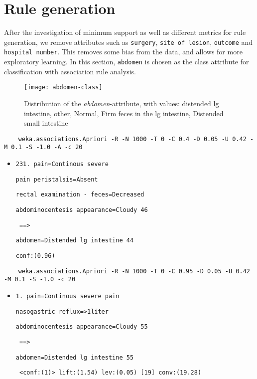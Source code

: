 \section{Rule generation} \label{sec: rule gen}
After the investigation of minimum support as well as different metrics for rule generation, we remove attributes such as \verb|surgery|, \verb|site of lesion|, \verb|outcome| and \verb|hospital number|. This removes some bias from the data, and allows for more exploratory learning. In this section, \verb|abdomen| is chosen as the class attribute for classification with association rule analysis.

\begin{figure}[H]
\centering
\texttt{[image: abdomen-class]}
\caption{Distribution of the \textit{abdomen}-attribute, with values: distended lg intestine, other, Normal, Firm feces in the lg intestine, Distended small intestine}
\end{figure}

\begin{verbatim}
	weka.associations.Apriori -R -N 1000 -T 0 -C 0.4 -D 0.05 -U 0.42 -M 0.1 -S -1.0 -A -c 20
\end{verbatim}
\begin{itemize}
\item \verb|231. pain=Continous severe|

\verb|pain peristalsis=Absent |

\verb|rectal examination - feces=Decreased |

\verb|abdominocentesis appearance=Cloudy 46|
 
\verb| ==> |

\verb|abdomen=Distended lg intestine 44   |

\verb|conf:(0.96)|
\end{itemize}
\begin{verbatim}
	weka.associations.Apriori -R -N 1000 -T 0 -C 0.95 -D 0.05 -U 0.42 -M 0.1 -S -1.0 -c 20
\end{verbatim}
\begin{itemize}
\item \verb|1. pain=Continous severe pain|

\verb|nasogastric reflux=>1liter |

\verb|abdominocentesis appearance=Cloudy 55|

 \verb| ==> |
 
 \verb|abdomen=Distended lg intestine 55 |

 \verb| <conf:(1)> lift:(1.54) lev:(0.05) [19] conv:(19.28)|
\end{itemize}

